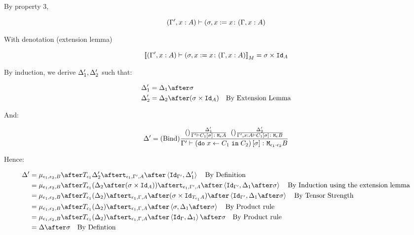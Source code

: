 \documentclass{report}
\begin{document}
By property 3,

\begin{equation}
    (\Gamma', x:A) \vdash (\sigma, x:= x \colon (\Gamma, x: A)
\end{equation}

With denotation (extension lemma)

\begin{equation}
    {\bf [\![}(\Gamma', x:A) \vdash (\sigma, x:= x \colon (\Gamma, x: A){\bf ]\!]}_M = \sigma\times\texttt{Id}_{A}
\end{equation}

By induction, we derive $\Delta_1', \Delta_2'$ such that:

\begin{align}
    \D_1' & = \D_1\after \si\\
    \D_2' & = \D_2\after (\si\times\Id{A})\qt{By Extension Lemma}
\end{align}

And:

\begin{equation}
    \Delta' = (\text{Bind}) \frac{
        (\text{}) \frac{\Delta_1'}{\Gamma' \vdash C_1\left[\sigma\right] \colon \texttt{M}_{\epsilon}{A}}
        \;\;
        (\text{}) \frac{\Delta_2'}{\Gamma', x:A  \vdash C_1\left[\sigma\right] \colon \texttt{M}_{\epsilon}{B}}
    }{
        \Gamma' \vdash (\texttt{do}\; x \leftarrow C_1 \;\texttt{in}\; C_2)\left[\sigma\right] \colon \texttt{M}_{\epsilon_1\cdot\epsilon_2}{B}
    }
\end{equation}

Hence:

\begin{align}
    \D' & = \bind{\e_1}{\e_2}{B}\after\T{\e_1}{\D_2'}\after\tstrength{\e_1}{\G'}{A}\after\pr{\Id{\G'}}{\D_1'}\qt{By Definition}\\
    & = \bind{\e_1}{\e_2}{B}\after\T{\e_1}{(\D_2\after(\si\times\Id{A}))}\after\tstrength{\e_1}{\G'}{A}\after\pr{\Id{\G'}}{\D_1\after\si}\qt{By Induction using the extension lemma}\\
    & = \bind{\e_1}{\e_2}{B}\after\T{\e_1}{(\D_2)}\after\tstrength{\e_1}{\G}{A}\after(\si\times\Id{\T{\e_1}{A}})\after\pr{\Id{\G'}}{\D_1\after\si}\qt{By Tensor Strength}\\
    & = \bind{\e_1}{\e_2}{B}\after\T{\e_1}{(\D_2)}\after\tstrength{\e_1}{\G}{A}\after\pr{\si}{\D_1\after\si}\qt{By Product rule}\\
    & = \bind{\e_1}{\e_2}{B}\after\T{\e_1}{(\D_2)}\after\tstrength{\e_1}{\G}{A}\after\pr{\idg}{\D_1}\after\si\qt{By Product rule}\\
    &= \D\after\si\qt{By Defintion}\\
\end{align}
\end{document}
